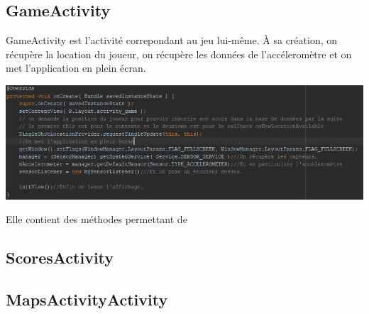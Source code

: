 \documentclass{article}
\begin{document}
\subsection{GameActivity}
\label{subsection:2_2}
GameActivity est l'activité correpondant au jeu lui-même.
\`A sa création, on récupère la location du joueur, on récupère les données de l'accéleromètre et on met l'application en plein écran.
\begin{center}
  \includegraphics[scale=0.5]{GameActivity_onCreate.png}
\end{center}
Elle contient des méthodes permettant de 

\subsection{ScoresActivity}
\label{subsection:2_3}

\subsection{MapsActivityActivity}
\label{subsection:2_4}

%
%
\end{document}
